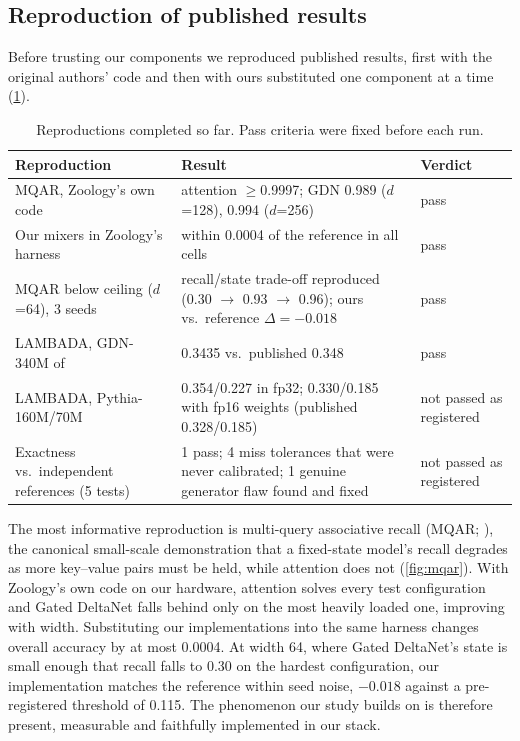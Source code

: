 \documentclass[10pt,a4paper]{article}
\begin{document}
\subsection{Reproduction of published results}
Before trusting our components we reproduced published results, first with the original authors'
code and then with ours substituted one component at a time (\cref{tab:repro}).

\begin{table}[t]
\centering\tablefont
\caption{Reproductions completed so far. Pass criteria were fixed before each run.}
\label{tab:repro}
\begin{tabularx}{\textwidth}{@{}>{\raggedright\arraybackslash}p{4.2cm} X l@{}}
\toprule
Reproduction & Result & Verdict \\
\midrule
MQAR, Zoology's own code \citep{arora2023zoology} & attention $\ge$0.9997; GDN 0.989 ($d$=128), 0.994 ($d$=256) & pass \\
Our mixers in Zoology's harness & within 0.0004 of the reference in all cells & pass \\
MQAR below ceiling ($d$=64), 3 seeds & recall/state trade-off reproduced (0.30 $\to$ 0.93 $\to$ 0.96); ours vs.\ reference $\Delta=-0.018$ & pass \\
LAMBADA, GDN-340M of \citet{wang2025systematic} & 0.3435 vs.\ published 0.348 & pass \\
LAMBADA, Pythia-160M/70M \citep{biderman2023pythia} & 0.354/0.227 in fp32; 0.330/0.185 with fp16 weights (published 0.328/0.185) & not passed as registered \\
Exactness vs.\ independent references (5 tests) & 1 pass; 4 miss tolerances that were never calibrated; 1 genuine generator flaw found and fixed & not passed as registered \\
\bottomrule
\end{tabularx}
\end{table}

The most informative reproduction is multi-query associative recall
(MQAR; \citealp{arora2023zoology}), the canonical small-scale demonstration that a fixed-state model's
recall degrades as more key--value pairs must be held, while attention does not (\cref{fig:mqar}).
With Zoology's own code on our hardware, attention solves every test configuration and Gated DeltaNet
falls behind only on the most heavily loaded one, improving with width. Substituting our
implementations into the same harness changes overall accuracy by at most 0.0004. At width 64,
where Gated DeltaNet's state is small enough that recall falls to 0.30 on the hardest configuration,
our implementation matches the reference within seed noise, $-0.018$ against a pre-registered
threshold of 0.115. The phenomenon our study builds on is therefore present, measurable and
faithfully implemented in our stack.
\end{document}
